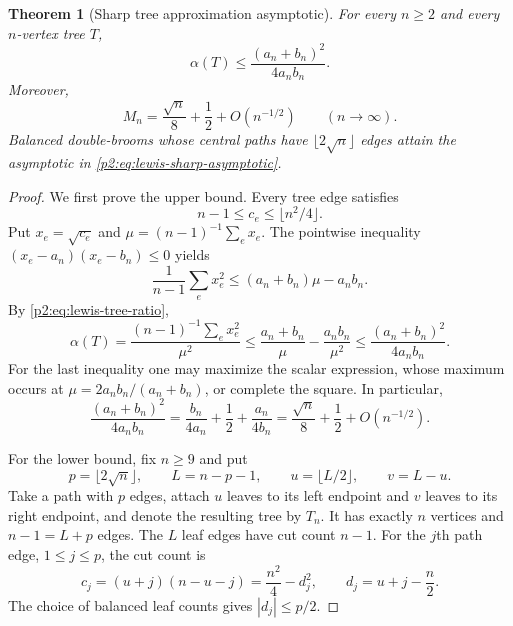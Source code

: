 \documentclass[11pt,a4paper]{article}
\newtheorem{theorem}{Theorem}[section]
\theoremstyle{definition}
\theoremstyle{remark}
\numberwithin{equation}{section}
\begin{document}
\begin{theorem}[Sharp tree approximation asymptotic]
\label{p2:thm:lewis-tree-sharp}
For every $n\geq2$ and every $n$-vertex tree $T$,
\begin{equation}\label{p2:eq:lewis-finite-upper}
 \alpha(T)\leq\frac{(a_n+b_n)^2}{4a_nb_n}.
\end{equation}
Moreover,
\begin{equation}\label{p2:eq:lewis-sharp-asymptotic}
 M_n=\frac{\sqrt n}{8}+\frac12+O(n^{-1/2})
 \qquad(n\longrightarrow\infty).
\end{equation}
Balanced double-brooms whose central paths have
$\lfloor2\sqrt n\rfloor$ edges attain the asymptotic in
\eqref{p2:eq:lewis-sharp-asymptotic}.
\end{theorem}

\begin{proof}
We first prove the upper bound.  Every tree edge satisfies
\[
 n-1\leq c_e\leq\lfloor n^2/4\rfloor.
\]
Put $x_e=\sqrt{c_e}$ and
$\mu=(n-1)^{-1}\sum_e x_e$.
The pointwise inequality $(x_e-a_n)(x_e-b_n)\leq0$ yields
\[
 \frac1{n-1}\sum_e x_e^2
 \leq(a_n+b_n)\mu-a_nb_n.
\]
By \eqref{p2:eq:lewis-tree-ratio},
\[
 \alpha(T)
 =\frac{(n-1)^{-1}\sum_e x_e^2}{\mu^2}
 \leq\frac{a_n+b_n}{\mu}-\frac{a_nb_n}{\mu^2}
 \leq\frac{(a_n+b_n)^2}{4a_nb_n}.
\]
For the last inequality one may maximize the scalar expression, whose
maximum occurs at $\mu=2a_nb_n/(a_n+b_n)$, or complete the square.
In particular,
\begin{equation}\label{p2:eq:lewis-upper-expansion}
 \frac{(a_n+b_n)^2}{4a_nb_n}
 =\frac{b_n}{4a_n}+\frac12+\frac{a_n}{4b_n}
 =\frac{\sqrt n}{8}+\frac12+O(n^{-1/2}).
\end{equation}

For the lower bound, fix $n\geq9$ and put
\[
 p=\lfloor2\sqrt n\rfloor,\qquad
 L=n-p-1,\qquad u=\lfloor L/2\rfloor,\qquad v=L-u.
\]
Take a path with $p$ edges, attach $u$ leaves to its left endpoint and
$v$ leaves to its right endpoint, and denote the resulting tree by
$T_n$.  It has exactly $n$ vertices and $n-1=L+p$ edges.
The $L$ leaf edges have cut count $n-1$.  For the $j$th path edge,
$1\leq j\leq p$, the cut count is
\begin{equation}\label{p2:eq:lewis-double-broom-cuts}
 c_j=(u+j)(n-u-j)=\frac{n^2}{4}-d_j^2,
 \qquad d_j=u+j-\frac n2.
\end{equation}
The choice of balanced leaf counts gives $|d_j|\leq p/2$.


\end{proof}
\end{document}
